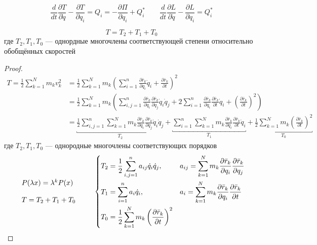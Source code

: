 \documentclass[crop=false]{standalone}
\begin{document}
\[\frac{d}{d t} \frac{\partial T}{\partial \dot q} - \frac{\partial T}{\partial q_i} = Q_i = - \frac{\partial \Pi}{\partial q_i} + Q_i^* \qquad \frac{d}{d t} \frac{\partial L}{\partial \dot q} - \frac{\partial L}{\partial q_i} = Q_i^*\]
\begin{theorem}
    \[T = T_2 + T_1 + T_0\]
    где $T_2, T_1, T_0$ — однордные многочлены соответствующей степени относительно обобщённых скоростей
\end{theorem}
\begin{proof}
    \[
    \begin{aligned}
    T = \frac{1}{2} \sum_{k=1}^{N} m_k v_k^2 &= \frac{1}{2} \sum_{k=1}^{N} m_k \left( \sum_{i=1}^{n} \frac{\partial \bar r_k}{\partial q_i} \dot q_i + \frac{\partial \bar r_k}{\partial t}\right)^2 \\
    &=\frac{1}{2} \sum_{k=1}^{N} m_k \left( \sum_{i, j=1}^{n} \frac{\partial \bar r_k}{\partial q_i} \frac{\partial \bar r_k}{\partial q_j} \dot q_i \dot q_j + 2 \sum_{i=1}^{n}  \frac{\partial \bar r_k}{\partial q_i} \frac{\partial \bar r_k}{\partial t} \dot q_i + \left(\frac{\partial \bar r_k}{\partial t}\right)^2 \right) \\
    &= \underbracket{\frac{1}{2} \sum_{i,j = 1}^{n} \sum_{k=1}^{N} m_k \frac{\partial \bar r_k}{\partial q_i} \frac{\partial \bar r_k}{\partial q_j} \dot q_i \dot q_j}_{T_2}
    + \underbracket{\sum_{i = 1}^{n} \sum_{k=1}^{N} m_k \frac{\partial \bar r_k}{\partial q_i} \frac{\partial \bar r_k}{\partial t} \dot q_i }_{T_1}
    + \underbracket{\frac{1}{2} \sum_{k=1}^{N} m_k \left(\frac{\partial \bar r_k}{\partial t}\right)^2}_{T_0}
    \end{aligned}
    \]
    где $T_2, T_1, T_0$ — однородные многочлены соответствующих порядков
    \[\begin{array}{l}
        P(\lambda x) = \lambda^k P(x) \\ \\ T = T_2 + T_1 + T_0
    \end{array}
        \qquad
    \begin{dcases}
        T_2 = \frac{1}{2} \sum_{i, j = 1}^{n} a_{i j} \dot q_i \dot q_j, & a_{i j} = \sum_{k=1}^{N} m_k \frac{\partial \bar r_k}{\partial q_i} \frac{\partial \bar r_k}{\partial q_j} \\
        T_1 = \sum_{i=1}^{n} a_i \dot q_i, & a_i = \sum_{k=1}^{N} m_k \frac{\partial \bar r_k}{\partial q_i} \frac{\partial \bar r_k}{\partial t} \\
        T_0 = \frac{1}{2} \sum_{k=1}^{N} m_k \left(\frac{\partial \bar r_k}{\partial t}\right)^2
    \end{dcases}
    \]
\end{proof}
\end{document}
